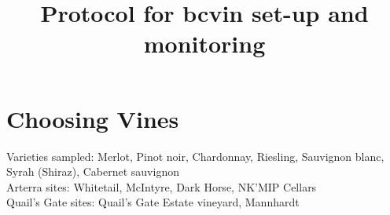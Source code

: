 \documentclass[11pt,letter]{article}
\begin{document}

\renewcommand{\refname}{\CHead{}}

\title{Protocol for bcvin set-up and monitoring}
\date{ }
\maketitle
\tableofcontents


\section{Choosing Vines}

Varieties sampled: Merlot, Pinot noir, Chardonnay, Riesling, Sauvignon blanc, Syrah (Shiraz), Cabernet sauvignon \\
Arterra sites: Whitetail, McIntyre, Dark Horse, NK'MIP Cellars \\
Quail's Gate sites: Quail's Gate Estate vineyard, Mannhardt \\
\end{document}
